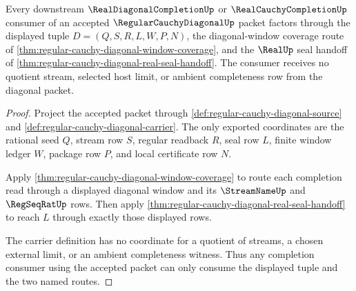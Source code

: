 \begin{theorem}
\label{thm:regular-cauchy-diagonal-completion-consumer-bridge}
Every downstream $\RealDiagonalCompletionUp$ or $\RealCauchyCompletionUp$ consumer of an accepted $\RegularCauchyDiagonalUp$ packet factors through the displayed tuple $D=(Q,S,R,L,W,P,N)$, the diagonal-window coverage route of \autoref{thm:regular-cauchy-diagonal-window-coverage}, and the $\RealUp$ seal handoff of \autoref{thm:regular-cauchy-diagonal-real-seal-handoff}. The consumer receives no quotient stream, selected host limit, or ambient completeness row from the diagonal packet.
\end{theorem}
\begin{proof}
Project the accepted packet through \autoref{def:regular-cauchy-diagonal-source} and \autoref{def:regular-cauchy-diagonal-carrier}. The only exported coordinates are the rational seed $Q$, stream row $S$, regular readback $R$, seal row $L$, finite window ledger $W$, package row $P$, and local certificate row $N$.

Apply \autoref{thm:regular-cauchy-diagonal-window-coverage} to route each completion read through a displayed diagonal window and its $\StreamNameUp$ and $\RegSeqRatUp$ rows. Then apply \autoref{thm:regular-cauchy-diagonal-real-seal-handoff} to reach $L$ through exactly those displayed rows.

The carrier definition has no coordinate for a quotient of streams, a chosen external limit, or an ambient completeness witness. Thus any completion consumer using the accepted packet can only consume the displayed tuple and the two named routes.
\end{proof}

